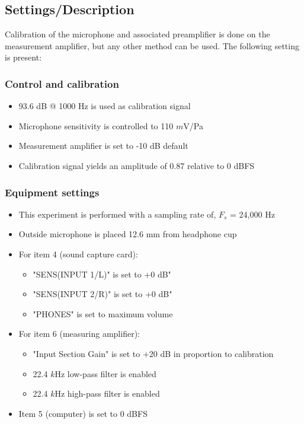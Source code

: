 \subsection{Settings/Description}
\label{SettingsHeadPhones}

Calibration of the microphone and associated preamplifier is done on the measurement amplifier, but any other method can be used. The following setting is present:
\subsubsection{Control and calibration}
\begin{itemize}
	\item 93.6 dB @ 1000 Hz is used as calibration signal
	\item Microphone sensitivity is controlled to 110 $m$V/Pa
	\item Measurement amplifier is set to -10 dB default
	\item Calibration signal yields an amplitude of 0.87 relative to 0 dBFS
\end{itemize}
\subsubsection{Equipment settings}
\begin{itemize}
	\item This experiment is performed with a sampling rate of, $F_{s}$ = 24,000 Hz
	\item Outside microphone is placed 12.6 mm from headphone cup
	\item For item 4 (sound capture card):
	\begin{itemize}
		\item "SENS(INPUT 1/L)" is set to +0 dB"
		\item "SENS(INPUT 2/R)" is set to +0 dB"
		\item "PHONES" is set to maximum volume
	\end{itemize}		
	\item For item 6 (measuring amplifier):
		\begin{itemize}
			\item "Input Section Gain" is set to +20 dB in proportion to calibration
			\item 22.4 $k$Hz low-pass filter is enabled
			\item 22.4 $k$Hz high-pass filter is enabled 
		\end{itemize}
	\item Item 5 (computer) is set to 0 dBFS
\end{itemize}



